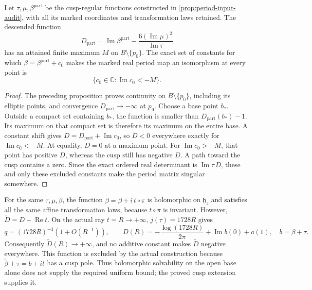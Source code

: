 \begin{proposition}
\label{prop:period-exact-admissible-constants}
Let \(\tau,\mu,\beta^{\mathrm{part}}\) be the cusp-regular functions
constructed in \cref{prop:period-input-audit}, with all its marked
coordinates and transformation laws retained.  The descended function
\[
 D_{\mathrm{part}}=
 \operatorname{Im}\beta^{\mathrm{part}}
 -\frac{6(\operatorname{Im}\mu)^2}{\operatorname{Im}\tau}
\]
has an attained finite maximum \(M\) on
\(B\setminus\{p_0\}\).  The exact set of constants for which
\(\beta=\beta^{\mathrm{part}}+c_0\) makes the marked real period map an
isomorphism at every point is
\[
 \{c_0\in\mathbb C:\operatorname{Im}c_0<-M\}.
\]
\end{proposition}

\begin{proof}
The preceding proposition proves continuity on
\(B\setminus\{p_0\}\), including its elliptic points, and convergence
\(D_{\mathrm{part}}\to-\infty\) at \(p_0\).  Choose a base point
\(b_*\).  Outside a compact set containing \(b_*\), the function is
smaller than \(D_{\mathrm{part}}(b_*)-1\).  Its maximum on that compact
set is therefore its maximum on the entire base.  A constant shift gives
\(D=D_{\mathrm{part}}+\operatorname{Im}c_0\), so \(D<0\) everywhere
exactly for \(\operatorname{Im}c_0<-M\).  At equality, \(D=0\) at a
maximum point.  For \(\operatorname{Im}c_0>-M\), that point has positive
\(D\), whereas the cusp still has negative \(D\).  A path toward the
cusp contains a zero.  Since the exact ordered real determinant is
\(\operatorname{Im}\tau\,D\), these and only these excluded constants
make the period matrix singular somewhere.
\end{proof}

\begin{remark}
For the same \(\tau,\mu,\beta\), the function
\(\widetilde\beta=\beta+i\,t\circ\pi\) is holomorphic on
\(\mathfrak h_z\) and satisfies all the same affine transformation laws,
because \(t\circ\pi\) is invariant.  However,
\(\widetilde D=D+\operatorname{Re}t\).  On the actual ray \(t=R\to+\infty\),
\(j(\tau)=1728R\) gives
\[
 q=(1728R)^{-1}(1+O(R^{-1})),\qquad
 D(R)=-\frac{\log(1728R)}{2\pi}
       +\operatorname{Im}b(0)+o(1),
 \quad b=\beta+\tau.
\]
Consequently \(\widetilde D(R)\to+\infty\), and no additive constant
makes \(\widetilde D\) negative everywhere.  This function is excluded
by the actual construction because
\(\widetilde\beta+\tau=b+i t\) has a cusp pole.  Thus holomorphic
solvability on the open base alone does not supply the required uniform
bound; the proved cusp extension supplies it.
\end{remark}


